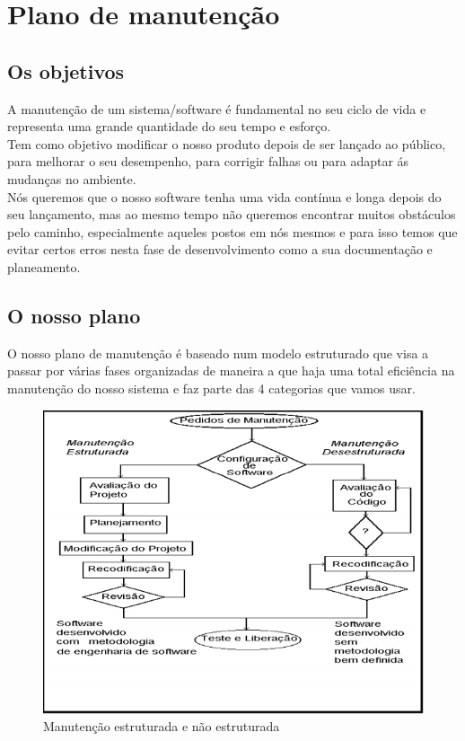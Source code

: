 \chapter{Plano de manutenção}
\label{plano_de_manutenção}
\section{Os objetivos}
A manutenção de um sistema/software é fundamental no seu ciclo de vida e representa uma grande quantidade do seu tempo e esforço.\\
Tem como objetivo modificar o nosso produto depois de ser lançado ao público, para melhorar o seu desempenho, para corrigir falhas ou para adaptar ás mudanças no ambiente.\\
Nós queremos que o nosso software tenha uma vida contínua e longa depois do seu lançamento, mas ao mesmo tempo não queremos encontrar muitos obstáculos pelo caminho, especialmente aqueles postos em nós mesmos e para isso temos que evitar certos erros nesta fase de desenvolvimento como a sua documentação e planeamento.
\section{O nosso plano}
O nosso plano de manutenção é baseado num modelo estruturado que visa a passar por várias fases organizadas de maneira a que haja uma total eficiência na manutenção do nosso sistema e faz parte das 4 categorias que vamos usar.

\begin{figure}[H]
	\centering
	\includegraphics[width=15cm]{Manutenção}
	\caption{Manutenção estruturada e não estruturada}
	\label{fig:Manutenção}
\end{figure}

